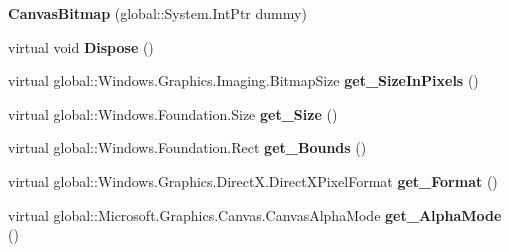 \begin{DoxyCompactItemize}
\item 
\mbox{\label{class_microsoft_1_1_graphics_1_1_canvas_1_1_canvas_bitmap_a9af813ca96be7e3caebb58d13fd31eaa}} 
{\bfseries Canvas\+Bitmap} (global\+::\+System.\+Int\+Ptr dummy)
\item 
\mbox{\label{class_microsoft_1_1_graphics_1_1_canvas_1_1_canvas_bitmap_ad658f3d180a76d7516d77f6b7fd64ed0}} 
virtual void {\bfseries Dispose} ()
\item 
\mbox{\label{class_microsoft_1_1_graphics_1_1_canvas_1_1_canvas_bitmap_a134d2eb2e2f01c81d58f22008c36bf46}} 
virtual global\+::\+Windows.\+Graphics.\+Imaging.\+Bitmap\+Size {\bfseries get\+\_\+\+Size\+In\+Pixels} ()
\item 
\mbox{\label{class_microsoft_1_1_graphics_1_1_canvas_1_1_canvas_bitmap_a4f2a3dcc57793a0c2a772d60467769b7}} 
virtual global\+::\+Windows.\+Foundation.\+Size {\bfseries get\+\_\+\+Size} ()
\item 
\mbox{\label{class_microsoft_1_1_graphics_1_1_canvas_1_1_canvas_bitmap_ac23e155a2d08d8412d714919eca3072b}} 
virtual global\+::\+Windows.\+Foundation.\+Rect {\bfseries get\+\_\+\+Bounds} ()
\item 
\mbox{\label{class_microsoft_1_1_graphics_1_1_canvas_1_1_canvas_bitmap_a82185afb0f99d94f364c3bff99691e22}} 
virtual global\+::\+Windows.\+Graphics.\+Direct\+X.\+Direct\+X\+Pixel\+Format {\bfseries get\+\_\+\+Format} ()
\item 
\mbox{\label{class_microsoft_1_1_graphics_1_1_canvas_1_1_canvas_bitmap_af6a87ba42d42fdd078bd722587c14731}} 
virtual global\+::\+Microsoft.\+Graphics.\+Canvas.\+Canvas\+Alpha\+Mode {\bfseries get\+\_\+\+Alpha\+Mode} ()
\item 
\mbox{\label{class_microsoft_1_1_graphics_1_1_canvas_1_1_canvas_bitmap_a793b0a5ddd66309a14c0ad273202d06d}} 

\end{DoxyCompactItemize}
